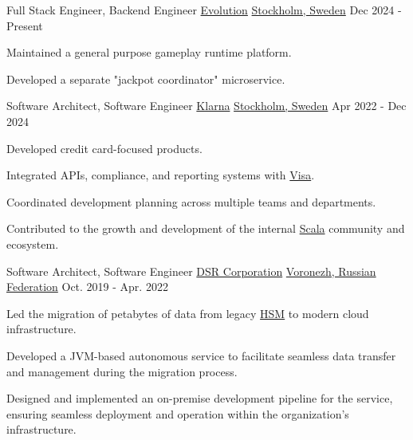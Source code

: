 
\begin{cventries}

	\cventry
	{Full Stack Engineer, Backend Engineer}
	{\href{https://www.linkedin.com/company/evolution-global}{Evolution}}
	{\href{https://www.google.com/maps/place/Stockholm}{Stockholm, Sweden}}
	{Dec 2024 - Present}
	{
		\begin{cvitems}
			\item {Maintained a general purpose gameplay runtime platform.}
			\item {Developed a separate "jackpot coordinator" microservice.}
		\end{cvitems}
	}


	\cventry
	{Software Architect, Software Engineer}
	{\href{https://www.linkedin.com/company/klarna/}{Klarna}}
	{\href{https://www.google.com/maps/place/Stockholm}{Stockholm, Sweden}}
	{Apr 2022 - Dec 2024}
	{
		\begin{cvitems}
			\item {Developed credit card-focused products.}
			\item {Integrated APIs, compliance, and reporting systems with \href{https://www.linkedin.com/company/visa/}{Visa}.}
			\item {Coordinated development planning across multiple teams and departments.}
			\item {Contributed to the growth and development of the internal \href{https://en.wikipedia.org/wiki/Scala_(programming_language)}{Scala} community and ecosystem.}
		\end{cvitems}
	}


	\cventry
	{Software Architect, Software Engineer}
	{\href{https://www.linkedin.com/company/dsr-corporation/}{DSR Corporation}}
	{\href{https://www.google.com/maps/place/Voronezh,+Voronezh+Oblast,+Russia}{Voronezh, Russian Federation}}
	{Oct. 2019 - Apr. 2022}
	{
		\begin{cvitems}
			\item {Led the migration of petabytes of data from legacy \href{https://en.wikipedia.org/wiki/Hierarchical_storage_management}{HSM} to modern cloud infrastructure.}
			\item {Developed a JVM-based autonomous service to facilitate seamless data transfer and management during the migration process.}
			\item {Designed and implemented an on-premise development pipeline for the service, ensuring seamless deployment and operation within the organization's infrastructure.}
		\end{cvitems}
	}


\end{cventries}
